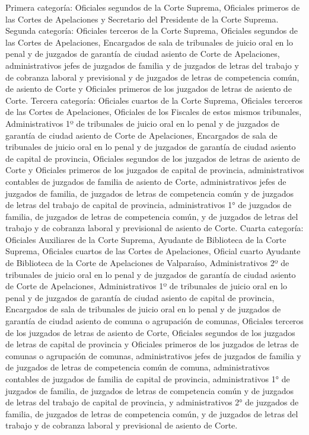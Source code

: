     Primera categoría: Oficiales segundos de la Corte Suprema, Oficiales primeros de las Cortes de Apelaciones y Secretario del Presidente de la Corte Suprema.
    Segunda categoría: Oficiales terceros de la Corte Suprema, Oficiales segundos de las Cortes de Apelaciones, Encargados de sala de tribunales de juicio oral en lo penal y de juzgados de garantía de ciudad asiento de Corte de Apelaciones, administrativos jefes de juzgados de familia y de juzgados de letras del trabajo y de cobranza laboral y previsional y de juzgados de letras de competencia común, de asiento de Corte y Oficiales primeros de los juzgados de letras de asiento de Corte.
    Tercera categoría: Oficiales cuartos de la Corte Suprema, Oficiales terceros de las Cortes de Apelaciones, Oficiales de los Fiscales de estos mismos tribunales, Administrativos 1º de tribunales de juicio oral en lo penal y de juzgados de garantía de ciudad asiento de Corte de Apelaciones, Encargados de sala de tribunales de juicio oral en lo penal y de juzgados de garantía de ciudad asiento de capital de provincia, Oficiales segundos de los juzgados de letras de asiento de Corte y Oficiales primeros de los juzgados de capital de provincia, administrativos contables de juzgados de familia de asiento de Corte, administrativos jefes de juzgados de familia, de juzgados de letras de competencia común y de juzgados de letras del trabajo de capital de provincia, administrativos 1° de juzgados de familia, de juzgados de letras de competencia común, y de juzgados de letras del trabajo y de cobranza laboral y previsional de asiento de Corte.
    Cuarta categoría: Oficiales Auxiliares de la Corte Suprema, Ayudante de Biblioteca de la Corte Suprema, Oficiales cuartos de las Cortes de Apelaciones, Oficial cuarto Ayudante de Biblioteca de la Corte de Apelaciones de Valparaíso, Administrativos 2º de tribunales de juicio oral en lo penal y de juzgados de garantía de ciudad asiento de Corte de Apelaciones, Administrativos 1º de tribunales de juicio oral en lo penal y de juzgados de garantía de ciudad asiento de capital de provincia, Encargados de sala de tribunales de juicio oral en lo penal y de juzgados de garantía de ciudad asiento de comuna o agrupación de comunas, Oficiales terceros de los juzgados de letras de asiento de Corte, Oficiales segundos de los juzgados de letras de capital de provincia y Oficiales primeros de los juzgados de letras de comunas o agrupación de comunas, administrativos jefes de juzgados de familia y de juzgados de letras de competencia común de comuna, administrativos contables de juzgados de familia de capital de provincia, administrativos 1° de juzgados de familia, de juzgados de letras de competencia común y de juzgados de letras del trabajo de capital de provincia, y administrativos 2° de juzgados de familia, de juzgados de letras de competencia común, y de juzgados de letras del trabajo y de cobranza laboral y previsional de asiento de Corte.
